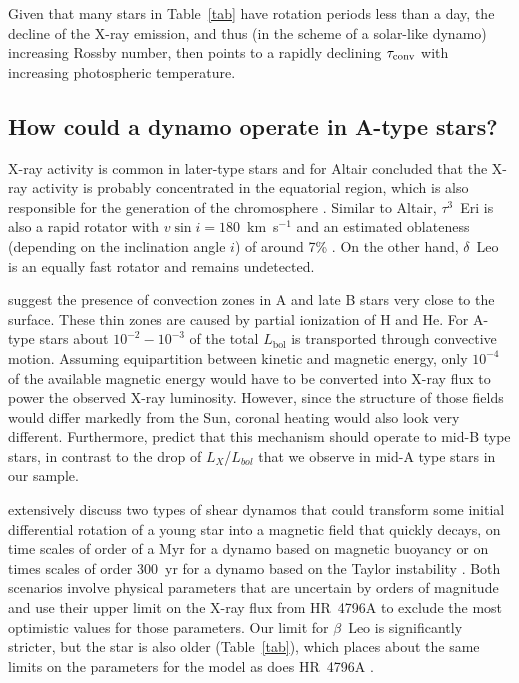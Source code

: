 \documentclass[linenumbers]{aastex631}
\begin{document}
Given that many stars in Table~\ref{tab} have rotation periods less than a day, the decline of the X-ray emission, and thus (in the scheme of a solar-like dynamo) increasing Rossby number, then points to a rapidly declining $\tau_{\rm conv}$ with increasing photospheric temperature. 


\subsection{How could a dynamo operate in A-type stars?}
\label{sect:dynamos}

X-ray activity is common in later-type stars and for Altair
\citet{2009A&A...497..511R} concluded that the X-ray activity is
probably concentrated in the equatorial region, which is also
responsible for the generation of the chromosphere
\citep{1995ApJ...439.1011F}. Similar to Altair, $\tau^3$~Eri is also a
rapid rotator with $v\sin i=180$~km~s$^{-1}$ and an estimated oblateness
(depending on the inclination angle $i$) of around 7\%
\citep{2012A&ARv..20...51V}. On the other hand, $\delta$~Leo is an
equally fast rotator and remains undetected.

\citet{2019ApJ...883..106C} suggest the presence of 
convection zones in A and late B stars very close to the surface. These thin zones are caused
by partial ionization of H and He. For A-type stars about $10^{-2}-10^{-3}$ of the total $L_\mathrm{bol}$ is transported through convective motion. Assuming equipartition between kinetic and magnetic energy, only $10^{-4}$ of the available magnetic energy would have to be converted into X-ray flux to power the observed X-ray luminosity. However, since the structure of those fields would differ markedly from the Sun, coronal heating would also look very different. Furthermore, \citet{2019ApJ...883..106C} predict that this mechanism should operate to mid-B type stars, in contrast to the drop of $L_X$/$L_{bol}$ that we observe in mid-A type stars in our sample.


\citet{2014ApJ...786..136D} extensively discuss two types of shear
dynamos that could transform some initial differential rotation of a
young star into a magnetic field that quickly decays, on time scales
of order of a Myr for a dynamo based on magnetic buoyancy
\citep{1995MNRAS.272..528T} or on times scales of order 300~yr for a
dynamo based on the Taylor instability
\citep{2002A&A...381..923S,2006A&A...449..451B}. Both scenarios
involve physical parameters that are uncertain by orders of magnitude
and \citet{2014ApJ...786..136D} use their upper limit on the X-ray
flux from HR~4796A to exclude the most optimistic values for those
parameters. Our limit for $\beta$~Leo is significantly stricter, but
the star is also older (Table~\ref{tab}), which places about the same
limits on the parameters for the \citet{1995MNRAS.272..528T} model as
does HR~4796A \citep[See Fig 3 in][]{2014ApJ...786..136D}.
\end{document}
